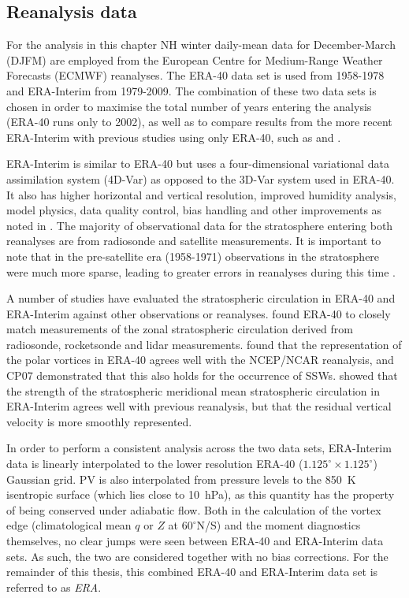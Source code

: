 \subsection{Reanalysis data}
\label{sec:reanalysis-data}
For the analysis in this chapter NH winter daily-mean data for
December-March (DJFM) are employed from the European Centre for Medium-Range
Weather Forecasts (ECMWF) reanalyses. The ERA-40 data set \citep{Uppala2005} is
used from 1958-1978 and ERA-Interim \citep{Dee2011} from 1979-2009. The
combination of these two data sets is chosen in order to maximise the total
number of years entering the analysis (ERA-40 runs only to 2002), as well as to
compare results from the more recent ERA-Interim with previous studies using
only ERA-40, such as \citet{Charlton2007} and \citet{Mitchell2013}.

ERA-Interim is similar to ERA-40 but uses a four-dimensional variational data
assimilation system (4D-Var) as opposed to the 3D-Var system used in ERA-40. It
also has higher horizontal and vertical resolution, improved humidity analysis,
model physics, data quality control, bias handling and other improvements as
noted in \citet{Simmons2007}. The majority of observational data for the
stratosphere entering both reanalyses are from radiosonde and satellite
measurements. It is important to note that in the pre-satellite era (1958-1971)
observations in the stratosphere were much more sparse, leading to greater
errors in reanalyses during this time \citep{Uppala2005}.

A number of studies have evaluated the stratospheric circulation in ERA-40 and
ERA-Interim against other observations or reanalyses. \citet{Randel2004} found
ERA-40 to closely match measurements of the zonal stratospheric circulation
derived from radiosonde, rocketsonde and lidar
measurements. \citet{Karpetchko2005} found that the representation of the polar
vortices in ERA-40 agrees well with the NCEP/NCAR reanalysis, and CP07
demonstrated that this also holds for the occurrence of
SSWs. \citet{Seviour2012} showed that the strength of the stratospheric
meridional mean stratospheric circulation in ERA-Interim agrees well with
previous reanalysis, but that the residual vertical velocity is more smoothly
represented.

In order to perform a consistent analysis across the two data sets, ERA-Interim
data is linearly interpolated to the lower resolution ERA-40
($1.125^{\circ} \times 1.125^{\circ}$) Gaussian grid. PV is also interpolated
from pressure levels to the 850~K isentropic surface (which lies close to
10~hPa), as this quantity has the property of being conserved under adiabatic
flow. Both in the calculation of the vortex edge (climatological mean $q$ or $Z$
at $60^{\circ}$N/S) and the moment diagnostics themselves, no clear jumps were
seen between ERA-40 and ERA-Interim data sets. As such, the two are considered
together with no bias corrections. For the remainder of this thesis, this
combined ERA-40 and ERA-Interim data set is referred to as \emph{ERA}.


